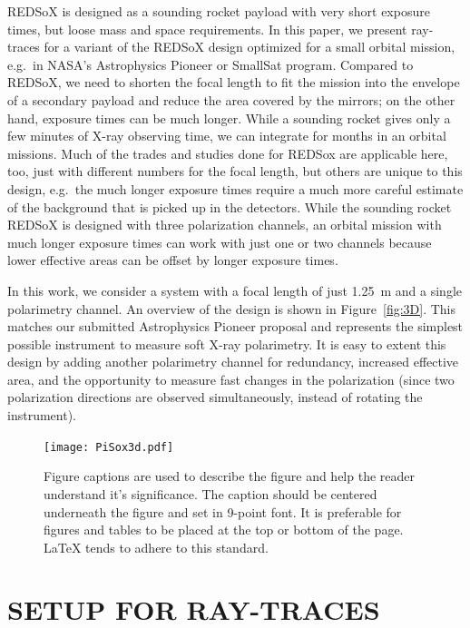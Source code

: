 \documentclass[]{spie}  %
\begin{document}
REDSoX is designed as a sounding rocket payload with very short exposure times, but loose mass and space requirements. In this paper, we present ray-traces for a variant of the REDSoX design optimized for a small orbital mission, e.g.\ in NASA's Astrophysics Pioneer or SmallSat program. Compared to REDSoX, we need to shorten the focal length to fit the mission into the envelope of a secondary payload and reduce the area covered by the mirrors; on the other hand, exposure times can be much longer. While a sounding rocket gives only a few minutes of X-ray observing time, we can integrate for months in an orbital missions. Much of the trades and studies done for REDSox\cite{redsoxtrace} are applicable here, too, just with different numbers for the focal length, but others are unique to this design, e.g.\ the much longer exposure times require a much more careful estimate of the background that is picked up in the detectors.
While the sounding rocket REDSoX is designed with three polarization channels, an orbital mission with much longer exposure times can work with just one or two channels because lower effective areas can be offset by longer exposure times.

In this work, we consider a system with a focal length of just 1.25~m and a single polarimetry channel. An overview of the design is shown in Figure~\ref{fig:3D}. This matches our submitted Astrophysics Pioneer proposal and represents the simplest possible instrument to measure soft X-ray polarimetry. It is easy to extent this design by adding another polarimetry channel for redundancy, increased effective area, and the opportunity to measure fast changes in the polarization (since two polarization directions are observed simultaneously, instead of rotating the instrument). 

   \begin{figure} [ht]
   \begin{center}
   \texttt{[image: PiSox3d.pdf]}
   \end{center}
   \caption[example] 
   { \label{fig:example} 
Figure captions are used to describe the figure and help the reader understand it's significance.  The caption should be centered underneath the figure and set in 9-point font.  It is preferable for figures and tables to be placed at the top or bottom of the page. LaTeX tends to adhere to this standard.}
   \end{figure} 

\section{SETUP FOR RAY-TRACES}
\end{document}
